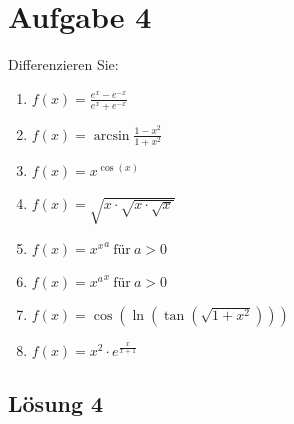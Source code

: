 \documentclass[main.tex]{subfiles}
\begin{document}
\section{Aufgabe 4}
Differenzieren Sie:

\begin{enumerate}
    \item $f( x) =\frac{e^{x} -e^{-x}}{e^{x} +e^{-x}}$
    \item $f( x) =\arcsin\frac{1-x^{2}}{1+x^{2}}$
    \item $f( x) =x^{\cos( x)}$
    \item $f( x) =\sqrt{x\cdotp \sqrt{x\cdotp \sqrt{x}}}$
    \item $f( x) =x{^{x}}^{a} \ \text{für} \ a >0$
    \item $f( x) =x{^{a}}^{x} \ \text{für} \ a >0$
    \item $f( x) =\cos\left(\ln\left(\tan\left(\sqrt{1+x^{2}}\right)\right)\right)$
    \item $f( x) =x^{2} \cdotp e^{\frac{x}{x+1}}$
\end{enumerate}

\subsection{Lösung 4}
\end{document}
